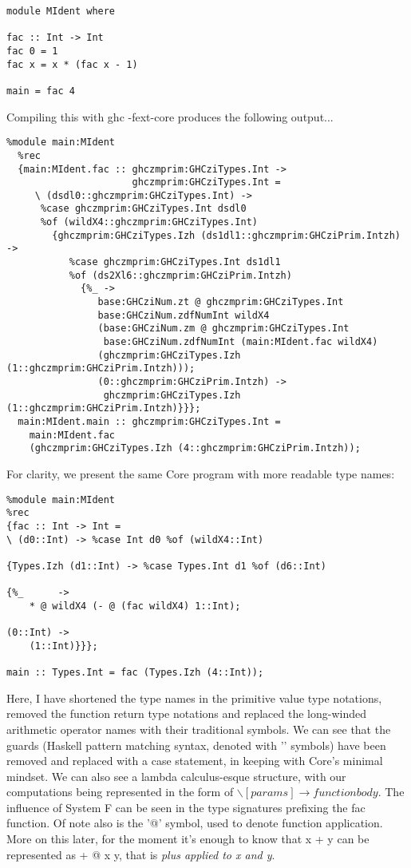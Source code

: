 \begin{verbatim}
module MIdent where

fac :: Int -> Int
fac 0 = 1
fac x = x * (fac x - 1)

main = fac 4
\end{verbatim}

\noindent Compiling this with ghc -fext-core produces the following output...

\begin{verbatim}
%module main:MIdent
  %rec
  {main:MIdent.fac :: ghczmprim:GHCziTypes.Int ->
                      ghczmprim:GHCziTypes.Int =
     \ (dsdl0::ghczmprim:GHCziTypes.Int) ->
      %case ghczmprim:GHCziTypes.Int dsdl0
      %of (wildX4::ghczmprim:GHCziTypes.Int)
        {ghczmprim:GHCziTypes.Izh (ds1dl1::ghczmprim:GHCziPrim.Intzh) ->
           %case ghczmprim:GHCziTypes.Int ds1dl1
           %of (ds2Xl6::ghczmprim:GHCziPrim.Intzh)
             {%_ ->
                base:GHCziNum.zt @ ghczmprim:GHCziTypes.Int 
                base:GHCziNum.zdfNumInt wildX4
                (base:GHCziNum.zm @ ghczmprim:GHCziTypes.Int
                 base:GHCziNum.zdfNumInt (main:MIdent.fac wildX4)
                (ghczmprim:GHCziTypes.Izh (1::ghczmprim:GHCziPrim.Intzh)));
                (0::ghczmprim:GHCziPrim.Intzh) ->
                 ghczmprim:GHCziTypes.Izh (1::ghczmprim:GHCziPrim.Intzh)}}};
  main:MIdent.main :: ghczmprim:GHCziTypes.Int =
    main:MIdent.fac
    (ghczmprim:GHCziTypes.Izh (4::ghczmprim:GHCziPrim.Intzh));
\end{verbatim}

\noindent For clarity, we present the same Core program with more readable
type names:

\begin{verbatim}
%module main:MIdent
%rec
{fac :: Int -> Int =
\ (d0::Int) -> %case Int d0 %of (wildX4::Int)

{Types.Izh (d1::Int) -> %case Types.Int d1 %of (d6::Int)

{%_      ->
    * @ wildX4 (- @ (fac wildX4) 1::Int);

(0::Int) ->
    (1::Int)}}};

main :: Types.Int = fac (Types.Izh (4::Int));
\end{verbatim}

\noindent Here, I have shortened the type names in the
primitive value type notations, removed the function return type notations
and replaced the long-winded arithmetic operator names with their traditional
symbols. We can see that the guards (Haskell pattern matching syntax, denoted
with '\textbar' symbols) have been removed and replaced with a case statement, in
keeping with Core's minimal mindset. We can also see a lambda calculus-esque
structure, with our computations being represented in the form of \( \backslash
[params] \rightarrow function body\). The influence of System F can be seen in
the type signatures prefixing the fac function. Of note also is the '@' symbol, used
to denote function application. More on this later, for the moment it's enough
to know that x + y can be represented as + @ x y, that is \emph{plus applied to
x and y}. 

